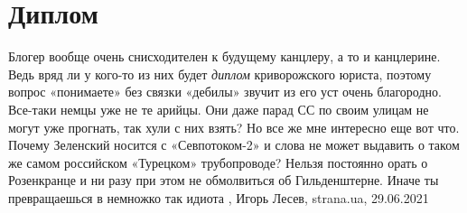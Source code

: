  
 
 
 
 
\chapter{Диплом}
\label{sec:slova.diplom}

Блогер вообще очень снисходителен к будущему канцлеру, а то и канцлерине. Ведь
вряд ли у кого-то из них будет \emph{диплом} криворожского юриста, поэтому вопрос
«понимаете» без связки «дебилы» звучит из его уст очень благородно. Все-таки
немцы уже не те арийцы. Они даже парад СС по своим улицам не могут уже
прогнать, так хули с них взять? Но все же мне интересно еще вот что. Почему
Зеленский носится с «Севпотоком-2» и слова не может выдавить о таком же самом
российском «Турецком» трубопроводе? Нельзя постоянно орать о Розенкранце и ни
разу при этом не обмолвиться об Гильденштерне. Иначе ты превращаешься в
немножко так идиота
, 
Игорь Лесев, strana.ua, 29.06.2021

